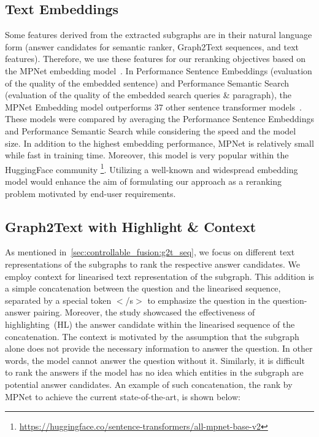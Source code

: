\subsection{Text Embeddings} \label{mpnet_explain}
Some features derived from the extracted subgraphs are in their natural language form (answer candidates for semantic ranker, Graph2Text sequences, and text features). Therefore, we use these features for our reranking objectives based on the MPNet embedding model~\cite{DBLP:conf/nips/Song0QLL20}. In Performance Sentence Embeddings (evaluation of the quality of the embedded sentence) and Performance Semantic Search (evaluation of the quality of the embedded search queries \& paragraph), the MPNet Embedding model outperforms 37 other sentence transformer models~\cite{reimers-2019-sentence-bert}. These models were compared by averaging the Performance Sentence Embeddings and Performance Semantic Search while considering the speed and the model size. In addition to the highest embedding performance, MPNet is relatively small while fast in training time. Moreover, this model is very popular within the HuggingFace community \footnote{\url{https://huggingface.co/sentence-transformers/all-mpnet-base-v2}}. Utilizing a well-known and widespread embedding model would enhance the aim of formulating our approach as a reranking problem motivated by end-user requirements. 

\subsection{Graph2Text with Highlight \& Context} \label{hl_context}
As mentioned in~\ref{sec:controllable_fusion:g2t_seq}, we focus on different text representations of the subgraphs to rank the respective answer candidates. 
We employ context for linearised text representation of the subgraph. This addition is a simple concatenation between the question and the linearised sequence, separated by a special token $<$/s$>$ to emphasize the question in the question-answer pairing. Moreover, the study showcased the effectiveness of highlighting~(HL) the answer candidate within the linearised sequence of the concatenation. 
The context is motivated by the assumption that the subgraph alone does not provide the necessary information to answer the question. In other words, the model cannot answer the question without it. Similarly, it is difficult to rank the answers if the model has no idea which entities in the subgraph are potential answer candidates.
An example of such concatenation, the rank by MPNet to achieve the current state-of-the-art, is shown below:  

